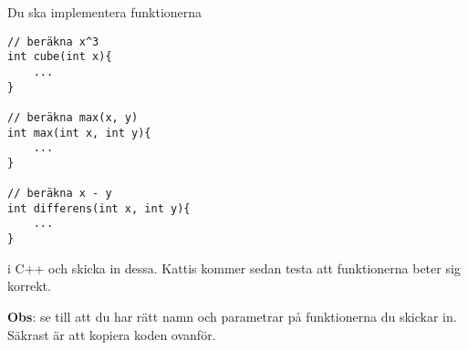 
Du ska implementera funktionerna

\begin{verbatim}
// beräkna x^3
int cube(int x){
	...
}

// beräkna max(x, y)
int max(int x, int y){
	...
}

// beräkna x - y
int differens(int x, int y){
	...
}
\end{verbatim}

i C++ och skicka in dessa. Kattis kommer sedan testa att funktionerna beter sig korrekt.

\textbf{Obs}: se till att du har rätt namn och parametrar på funktionerna du skickar in. Säkrast är att kopiera koden ovanför.
